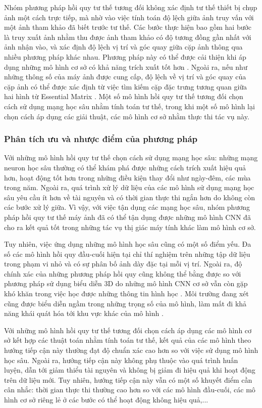 Nhóm phương pháp hồi quy tư thế tương đối không xác định tư thế thiết bị chụp ảnh một cách trực tiếp, mà nhờ vào việc tính toán độ lệch giữa ảnh truy vấn với một ảnh tham khảo đã biết trước tư thế. Các bước thực hiện bao gồm hai bước là truy xuất ảnh nhằm thu được ảnh tham khảo có độ tương đồng gần nhất với ảnh nhận vào, và xác định độ lệch vị trí và góc quay giữa cặp ảnh thông qua nhiều phương pháp khác nhau. Phương pháp này có thể được cải thiện khi áp dụng những mô hình cơ sở có khả năng trích xuất tốt hơn \cite{shavit2023coarse}. Ngoài ra, nếu như những thông số của máy ảnh được cung cấp, độ lệch về vị trí và góc quay của cặp ảnh có thể được xác định từ việc tìm kiếm cặp đặc trưng tương quan giữa hai hình từ Essential Matrix \cite{zhou2020learn}. Một số mô hình hồi quy tư thế tương đối chọn cách sử dụng mạng học sâu nhằm tính toán tư thế, trong khi một số mô hình lại chọn cách áp dụng các giải thuật, các mô hình cơ sở nhằm thực thi tác vụ này.

\subsubsection*{Phân tích ưu và nhược điểm của phương pháp}

Với những mô hình hồi quy tư thế chọn cách sử dụng mạng học sâu: những mạng neuron học sâu thường có thể khám phá được những cách trích xuất hiệu quả hơn, hoạt động tốt hơn trong những điều kiện thay đổi như ngày-đêm, các mùa trong năm. Ngoài ra, quá trình xử lý dữ liệu của các mô hình sử dụng mạng học sâu yêu cầu ít hơn về tài nguyên và có thời gian thực thi ngắn hơn do không còn các bước xử lý giữa. Vì vậy, với việc tận dụng các mạng học sâu, nhóm phương pháp hồi quy tư thế máy ảnh đã có thể tận dụng được những mô hình CNN đã cho ra kết quả tốt trong những tác vụ thị giác máy tính khác làm mô hình cơ sở.

Tuy nhiên, việc ứng dụng những mô hình học sâu cũng có một số điểm yếu. Đa số các mô hình hồi quy đầu-cuối hiện tại chỉ thí nghiệm trên những tập dữ liệu trong phạm vi nhỏ và có sự phân bố ảnh dày đặc tại mỗi vị trí. Ngoài ra, độ chính xác của những phương pháp hồi quy cũng không thể bằng được so với phương pháp sử dụng biểu diễn 3D do những mô hình CNN cơ sở vẫn còn gặp khó khăn trong việc học được những thông tin hình học \cite{zhou2020learn}. Môi trường đang xét cũng được biểu diễn ngầm trong những trọng số của mô hình, làm mất đi khả năng khái quát hóa tới khu vực khác của mô hình \cite{sattler2019understanding}.

Với những mô hình hồi quy tư thế tương đối chọn cách áp dụng các mô hình cơ sở kết hợp các thuật toán nhằm tính toán tư thế, kết quả của các mô hình theo hướng tiếp cận này thường đạt độ chuẩn xác cao hơn so với việc sử dụng mô hình học sâu. Ngoài ra, hướng tiếp cận này không phụ thuộc vào quá trình huấn luyện, dẫn tới giảm thiểu tài nguyên và không bị giảm đi hiệu quả khi hoạt động trên dữ liệu mới. Tuy nhiên, hướng tiếp cận này vẫn có một số khuyết điểm cần cân nhắc: thời gian thực thi thường cao hơn so với các mô hình đầu-cuối, các mô hình cơ sở riêng lẻ ở các bước có thể hoạt động không hiệu quả,...

